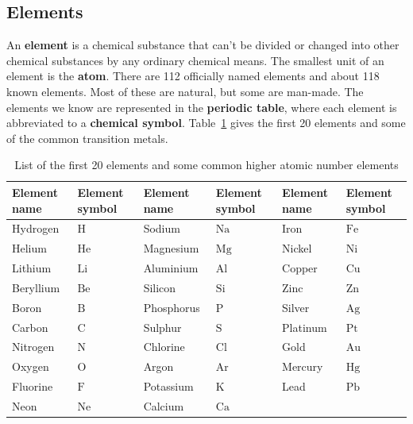             \subsection*{Elements}
            \nopagebreak
An \textbf{element} is a chemical substance that can't be divided or changed into other chemical substances by any ordinary chemical means. The smallest unit of an element is the \textbf{atom}.
There are 112 officially named elements and about 118 known elements. Most of these are natural, but some are man-made. The elements we know are represented in the \textbf{periodic table}, where each element is abbreviated to a \textbf{chemical symbol}. Table~\ref{tab:elements} gives the first 20 elements and some of the common transition metals.
\begin{table}[H]
\label{tab:elements}
\begin{center}
\begin{tabular}{|l|p{1.5cm}|l|p{1.5cm}|l|p{1.5cm}|}\hline
\textbf{Element name} & \textbf{Element symbol} & \textbf{Element name} & \textbf{Element symbol} & \textbf{Element name} & \textbf{Element symbol} \\ \hline
Hydrogen  & $\text{H}$  & Sodium     & $\text{Na}$ & Iron & $\text{Fe}$  \\ \hline
Helium    & $\text{He}$ & Magnesium  & $\text{Mg}$ & Nickel & $\text{Ni}$ \\ \hline
Lithium   & $\text{Li}$ & Aluminium  & $\text{Al}$ & Copper & $\text{Cu}$ \\ \hline
Beryllium & $\text{Be}$ & Silicon    & $\text{Si}$ & Zinc & $\text{Zn}$ \\ \hline 
Boron     & $\text{B}$  & Phosphorus & $\text{P}$  & Silver & $\text{Ag}$ \\ \hline
Carbon    & $\text{C}$  & Sulphur    & $\text{S}$  & Platinum & $\text{Pt}$ \\ \hline 
Nitrogen  & $\text{N}$  & Chlorine   & $\text{Cl}$ & Gold & $\text{Au}$ \\ \hline
Oxygen    & $\text{O}$  & Argon      & $\text{Ar}$ & Mercury & $\text{Hg}$ \\ \hline 
Fluorine  & $\text{F}$  & Potassium  & $\text{K}$  & Lead & $\text{Pb}$ \\ \hline
Neon      & $\text{Ne}$ & Calcium    & $\text{Ca}$ & &  \\ \hline
\end{tabular}
\end{center}

\caption{List of the first 20 elements and some common higher atomic number elements}
\end{table}
 
